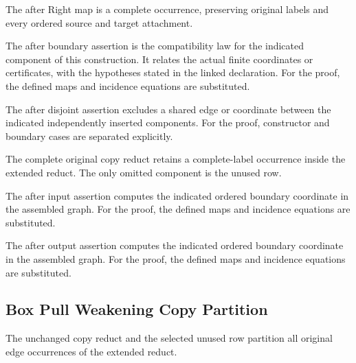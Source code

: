 The after Right map is a complete occurrence, preserving original labels and every ordered source and target attachment.
\par{}

The after boundary assertion is the compatibility law for the indicated component of this construction. It relates the actual finite coordinates or certificates, with the hypotheses stated in the linked declaration.
For the proof, the defined maps and incidence equations are substituted.
\par{}

The after disjoint assertion excludes a shared edge or coordinate between the indicated independently inserted components.
For the proof, constructor and boundary cases are separated explicitly.
\par{}

The complete original copy reduct retains a complete-label occurrence inside the extended reduct. The only omitted component is the unused row.
\par{}

The after input assertion computes the indicated ordered boundary coordinate in the assembled graph.
For the proof, the defined maps and incidence equations are substituted.
\par{}

The after output assertion computes the indicated ordered boundary coordinate in the assembled graph.
For the proof, the defined maps and incidence equations are substituted.
\par{}

\subsection{Box Pull Weakening Copy Partition}
The unchanged copy reduct and the selected unused row partition all original edge occurrences of the extended reduct.

